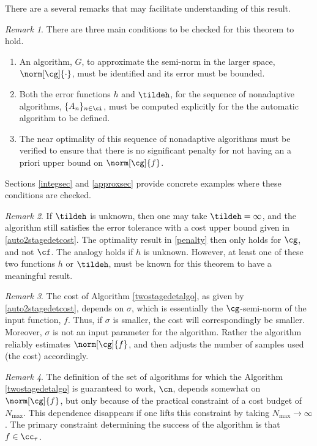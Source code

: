 \documentclass[final]{elsarticle}
\theoremstyle{definition}
\theoremstyle{remark}
\newtheorem{rem}{Remark}
\begin{document}
There are a several remarks that may facilitate understanding of this result.

\begin{rem} There are three main conditions to be checked for this theorem to hold.
\begin{enumerate}
\renewcommand{\labelenumi}{\roman{enumi}.}
\item An algorithm, $G$, to approximate the semi-norm in the larger space,  $\norm[\cg]{\cdot}$,  must be identified and its error must be bounded.
\item Both the error functions $h$ and $\tildeh$, for the sequence of nonadaptive algorithms, $\{A_n\}_{n \in \ci}$, must be computed explicitly for the the automatic algorithm to be defined.  
\item The near optimality of this sequence of nonadaptive algorithms must be verified to ensure that there is no significant penalty for not having an a priori upper bound on $\norm[\cg]{f}$.
\end{enumerate}
Sections \ref{integsec} and \ref{approxsec} provide concrete examples where these conditions are checked.
\end{rem}

\begin{rem} If $\tildeh$ is unknown, then one may take $\tildeh=\infty$, and the algorithm still satisfies the error tolerance with a cost upper bound given in \eqref{auto2stagedetcost}.  The optimality result in \eqref{penalty} then only holds for $\cg$, and not $\cf$.  The analogy holds if $h$ is unknown.  However, at least one of these two functions $h$ or $\tildeh$, must be known for this theorem to have a meaningful result.
\end{rem}

\begin{rem} The cost of Algorithm \ref{twostagedetalgo}, as given by \eqref{auto2stagedetcost}, depends on $\sigma$, which is essentially the $\cg$-semi-norm of the input function, $f$.  Thus, if $\sigma$ is smaller, the cost will correspondingly be smaller.  Moreover, $\sigma$ is not an input parameter for the algorithm.  Rather the algorithm reliably estimates $\norm[\cg]{f}$, and then adjusts the number of samples used (the cost) accordingly.
\end{rem}

\begin{rem}
The definition of the set of algorithms for which the Algorithm \ref{twostagedetalgo} is guaranteed to work, $\cn$, depends somewhat on $\norm[\cg]{f}$, but only because of the practical constraint of a cost budget of $N_{\max}$.  This dependence disappears if one lifts this constraint by taking $N_{\max} \to \infty$.  The primary constraint determining the success of the algorithm is that $f \in \cc_{\tau}$.
\end{rem}
\end{document}
